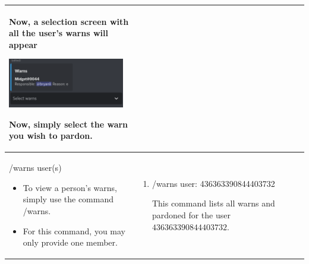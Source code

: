 \documentclass{scrartcl}
\begin{document}
\begin{tabularx}{\textwidth}{|>{\raggedright\arraybackslash}X|>{\raggedright\arraybackslash}X|}
\begin{enumerate}
    Now, a selection screen with all the user's warns will appear 
\end{enumerate}
\begin{center}
    \includegraphics[width=2in]{images/pardon.png}
\end{center}
\indent Now, simply select the warn you wish to pardon.
\\
\hline
/warns user(s)
\begin{itemize}
    \item To view a person's warns, simply use the command /warns.
    \item For this command, you may only provide one member.
\end{itemize}&
\begin{enumerate}
    \item /warns user: \color{gray}436363390844403732\color{black}
    
    This command lists all warns and pardoned for the user $436363390844403732.$
\end{enumerate}\\
\hline
\end{tabularx}
\newpage
\end{document}
